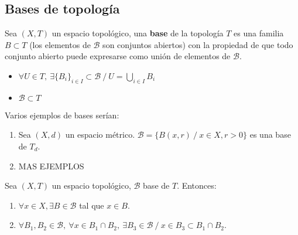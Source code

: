 \subsection{Bases de topología}
\begin{ndef}[Base]
  Sea $(X,T)$ un espacio topológico, una \textbf{base} de la topología $T$ es una familia $B \subset T$ (los elementos de $\mathcal{B}$ son conjuntos abiertos) con la propiedad de que todo conjunto abierto puede expresarse como unión de elementos de $\mathcal{B}$.
  \begin{itemize}
    \item $\forall U \in T,\ \exists \{B_i\}_{i \in I} \subset \mathcal{B}\ /\ U=\bigcup_{i \in I} B_i$
    \item $\mathcal{B} \subset T$
  \end{itemize}
\end{ndef}
\begin{exmp}
  Varios ejemplos de bases serían:
  \begin{enumerate}
    \item Sea $(X,d)$ un espacio métrico. $\mathcal{B}=\{B(x,r)\ /\ x \in X, r>0\}$ es una base de $T_d$.
    \item MAS EJEMPLOS
  \end{enumerate}
\end{exmp}

\begin{properties}
  Sea $(X,T)$ un espacio topológico, $\mathcal{B}$ base de $T$. Entonces:
  \begin{enumerate}
    \item $\forall x \in X, \exists B \in \mathcal{B}$ tal que $x \in B$.
    \item $\forall B_1,B_2 \in \mathcal{B},\ \forall x \in B_1 \cap B_2,\ \exists B_3 \in \mathcal{B}\ /\ x \in B_3 \subset B_1 \cap B_2$.
  \end{enumerate}
\end{properties}

